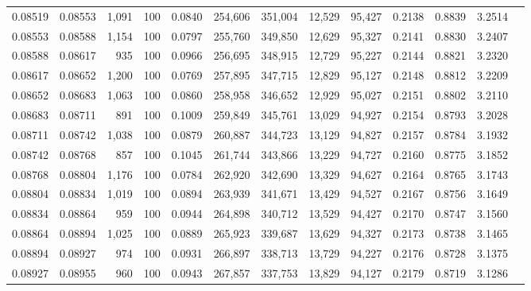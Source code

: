 \begin{tabular}{rrrrrrrrrrrrr}
0.08519 & 0.08553 & 1,091 & 100 &                                     0.0840 & 254,606 & 351,004 &  12,529 &  95,427 & 0.2138 & 0.8839 & 3.2514 \\
0.08553 & 0.08588 & 1,154 & 100 &                                     0.0797 & 255,760 & 349,850 &  12,629 &  95,327 & 0.2141 & 0.8830 & 3.2407 \\
0.08588 & 0.08617 &   935 & 100 &                                     0.0966 & 256,695 & 348,915 &  12,729 &  95,227 & 0.2144 & 0.8821 & 3.2320 \\
0.08617 & 0.08652 & 1,200 & 100 &                                     0.0769 & 257,895 & 347,715 &  12,829 &  95,127 & 0.2148 & 0.8812 & 3.2209 \\
0.08652 & 0.08683 & 1,063 & 100 &                                     0.0860 & 258,958 & 346,652 &  12,929 &  95,027 & 0.2151 & 0.8802 & 3.2110 \\
0.08683 & 0.08711 &   891 & 100 &                                     0.1009 & 259,849 & 345,761 &  13,029 &  94,927 & 0.2154 & 0.8793 & 3.2028 \\
0.08711 & 0.08742 & 1,038 & 100 &                                     0.0879 & 260,887 & 344,723 &  13,129 &  94,827 & 0.2157 & 0.8784 & 3.1932 \\
0.08742 & 0.08768 &   857 & 100 &                                     0.1045 & 261,744 & 343,866 &  13,229 &  94,727 & 0.2160 & 0.8775 & 3.1852 \\
0.08768 & 0.08804 & 1,176 & 100 &                                     0.0784 & 262,920 & 342,690 &  13,329 &  94,627 & 0.2164 & 0.8765 & 3.1743 \\
0.08804 & 0.08834 & 1,019 & 100 &                                     0.0894 & 263,939 & 341,671 &  13,429 &  94,527 & 0.2167 & 0.8756 & 3.1649 \\
0.08834 & 0.08864 &   959 & 100 &                                     0.0944 & 264,898 & 340,712 &  13,529 &  94,427 & 0.2170 & 0.8747 & 3.1560 \\
0.08864 & 0.08894 & 1,025 & 100 &                                     0.0889 & 265,923 & 339,687 &  13,629 &  94,327 & 0.2173 & 0.8738 & 3.1465 \\
0.08894 & 0.08927 &   974 & 100 &                                     0.0931 & 266,897 & 338,713 &  13,729 &  94,227 & 0.2176 & 0.8728 & 3.1375 \\
0.08927 & 0.08955 &   960 & 100 &                                     0.0943 & 267,857 & 337,753 &  13,829 &  94,127 & 0.2179 & 0.8719 & 3.1286 \\

\end{tabular}
